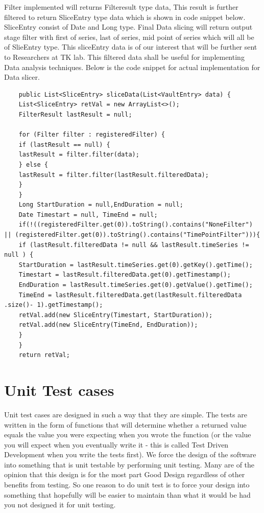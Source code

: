\documentclass[article,type=msc,colorback,accentcolor=tud9c,twoside,11pt]{tudthesis}
\begin{document}
	Filter implemented will returns Filteresult type data, This result is further filtered to  return SliceEntry type data which is shown in code snippet below. SliceEntry consist of Date and Long type. Final Data slicing will return output stage filter with first of series, last of series, mid point of series which will all be of SlieEntry type. This sliceEntry data is of our interest that will be further sent to Researchers at TK lab. This filtered data shall be useful for implementing Data analysis techniques\cite{DatananlysisandTechniques}. Below is the code snippet for actual implementation for Data slicer.
	\begin{lstlisting}
	public List<SliceEntry> sliceData(List<VaultEntry> data) {
	List<SliceEntry> retVal = new ArrayList<>();
	FilterResult lastResult = null;
	
	for (Filter filter : registeredFilter) {
	if (lastResult == null) {
	lastResult = filter.filter(data);
	} else {
	lastResult = filter.filter(lastResult.filteredData);
	}
	}
	Long StartDuration = null,EndDuration = null;
	Date Timestart = null, TimeEnd = null; 
	if(!((registeredFilter.get(0)).toString().contains("NoneFilter") || (registeredFilter.get(0)).toString().contains("TimePointFilter"))){
	if (lastResult.filteredData != null && lastResult.timeSeries != null ) {
	StartDuration = lastResult.timeSeries.get(0).getKey().getTime();
	Timestart = lastResult.filteredData.get(0).getTimestamp();
	EndDuration = lastResult.timeSeries.get(0).getValue().getTime();
	TimeEnd = lastResult.filteredData.get(lastResult.filteredData .size()- 1).getTimestamp();
	retVal.add(new SliceEntry(Timestart, StartDuration));
	retVal.add(new SliceEntry(TimeEnd, EndDuration)); 
	}
	} 
	return retVal;
	\end{lstlisting}
	\clearpage
	
	
	\section{Unit Test cases}
	Unit test cases are designed in such a way that they are simple\cite{JMLandJUnit}. The tests are written in the form of functions that will determine whether a returned value equals the value you were expecting when you wrote the function (or the value you will expect when you eventually write it - this is called Test Driven Development when you write the tests first). We force the design of the software into something that is unit testable by performing unit testing. Many are of the opinion that this design is for the most part Good Design regardless of other benefits from testing. So one reason to do unit test is to force your design into something that hopefully will be easier to maintain than what it would be had you not designed it for unit testing.
	
\end{document}
